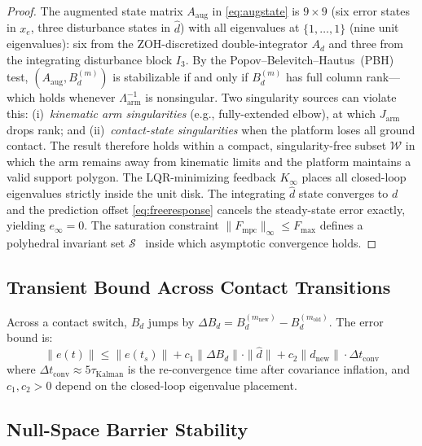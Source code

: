\documentclass[journal]{IEEEtran}
\newcommand{\Larm}{\Lambda_{\text{arm}}}
\newcommand{\Fmpc}{F_{\text{mpc}}}
\newcommand{\dhat}{\hat{d}}
\begin{document}
\begin{proof}
The augmented state matrix $A_{\text{aug}}$ in \eqref{eq:augstate} is
$9\times9$ (six error states in $x_e$, three disturbance states in $\dhat$)
with all eigenvalues at $\{1,\ldots,1\}$ (nine unit eigenvalues): six from
the ZOH-discretized double-integrator $A_d$ and three from the integrating
disturbance block $I_3$.
By the Popov--Belevitch--Hautus~(PBH) test,
$(A_{\text{aug}},B_d^{(m)})$ is stabilizable if and only if $B_d^{(m)}$
has full column rank---which holds whenever $\Larm^{-1}$ is nonsingular.
Two singularity sources can violate this: (i)~\emph{kinematic arm
singularities} (e.g., fully-extended elbow), at which $J_{\text{arm}}$
drops rank; and (ii)~\emph{contact-state singularities} when the platform
loses all ground contact.
The result therefore holds within a compact, singularity-free subset
$\mathcal{W}$ in which the arm remains away from kinematic limits and the
platform maintains a valid support polygon.
The LQR-minimizing feedback $K_\infty$ places all closed-loop eigenvalues
strictly inside the unit disk.
The integrating $\dhat$ state converges to $d$ and the prediction offset
\eqref{eq:freeresponse} cancels the steady-state error exactly, yielding
$e_\infty=0$.
The saturation constraint $\|\Fmpc\|_\infty\leq F_{\max}$ defines a
polyhedral invariant set $\mathcal{S}$~\cite{cao2002antiwindup} inside which
asymptotic convergence holds.
\end{proof}

\subsection{Transient Bound Across Contact Transitions}

Across a contact switch, $B_d$ jumps by
$\Delta B_d=B_d^{(m_{\text{new}})}-B_d^{(m_{\text{old}})}$.
The error bound is:
\begin{equation}\label{eq:transient}
  \|e(t)\| \leq \|e(t_s)\|
    + c_1\|\Delta B_d\|\cdot\|\dhat\|
    + c_2\|d_{\text{new}}\|\cdot\Delta t_{\text{conv}}
\end{equation}
where $\Delta t_{\text{conv}}\approx5\tau_{\text{Kalman}}$ is the
re-convergence time after covariance inflation, and $c_1,c_2>0$ depend on
the closed-loop eigenvalue placement.

\subsection{Null-Space Barrier Stability}
\end{document}
